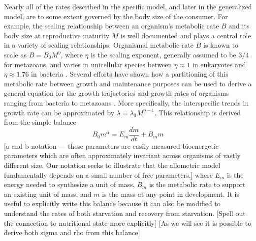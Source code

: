 \documentclass[12pt,english]{article}
\begin{document}
\begin{spacing}{1.9}
Nearly all of the rates described in the specific model, and later in the generalized model, are to some extent governed by the body size of the consumer. For example, the scaling relationship between an organism's metabolic rate $B$ and its body size at reproductive maturity $M$ is well documented \cite{} and plays a central role in a variety of scaling relationships.
Organismal metabolic rate $B$ is known to scale as $B = B_0 M^\eta$, where $\eta$ is the scaling exponent, generally assumed to be $3/4$ for metazoans, and varies in unicellular species between $\eta\approx 1$ in eukaryotes and $\eta\approx 1.76$ in bacteria \cite{delong}. Several efforts have shown how a partitioning of this metabolic rate between growth and maintenance purposes can be used to derive a general equation for the growth trajectories and growth rates of organisms ranging from bacteria to metazoans \cite{kempes}. More specifically, the interspecific trends in growth rate can be approximated by $\lambda = \lambda_0 M^{\eta-1}$. This relationship is derived from the simple balance
 \begin{equation}
 B_{0}m^{\alpha}=E_{m}\frac{dm}{dt}+B_{m}m
 \label{balance}
 \end{equation}
 [a and b notation --- these parameters are easily measured bioenergetic parameters which are often approximately invariant across organisms of vastly different size. Our notation seeks to illustrate that the allometric model fundamentally depends on a small number of free parameters.]
 where $E_{m}$ is the energy needed to synthesize a unit of mass, $B_{m}$ is the metabolic rate to support an existing unit of mass, and $m$ is the mass at any point in development. It is useful to explicitly write this balance because it can also be modified to understand the rates of both starvation and recovery from starvation. [Spell out the connection to nutritional state more explicitly] [As we will see it is possible to derive both sigma and rho from this balance]
 

\end{spacing}
\end{document}
